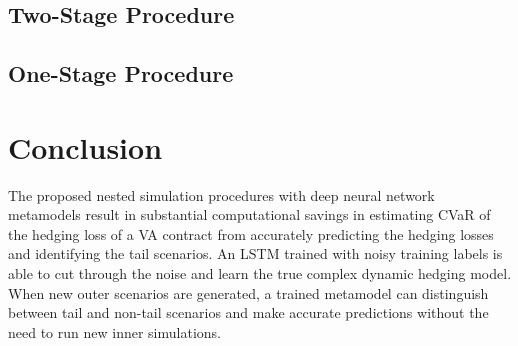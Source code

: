 \documentclass[]{article}
\begin{document}
\subsection{Two-Stage Procedure}

\subsection{One-Stage Procedure}

\section{Conclusion} \label{sec:conclusion}
The proposed nested simulation procedures with deep neural network metamodels result in substantial computational savings in estimating CVaR of the hedging loss of a VA contract from accurately predicting the hedging losses and identifying the tail scenarios.
An LSTM trained with noisy training labels is able to cut through the noise and learn the true complex dynamic hedging model.
When new outer scenarios are generated, a trained metamodel can distinguish between tail and non-tail scenarios and make accurate predictions without the need to run new inner simulations.


\newpage

\footnotesize

\end{document}
